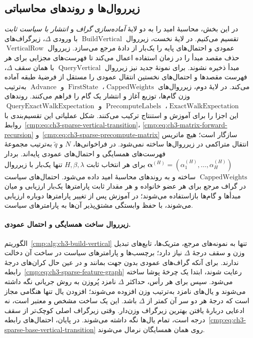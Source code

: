 \subsection{زیرروال‌ها و روندهای محاسباتی}
\label{cmp:subsec:ch3-computational-procedures}
در این بخش، محاسبهٔ امید را به دو لایهٔ
\emph{آماده‌سازی گراف} و \emph{انتشار با سیاست ثابت}
تقسیم می‌کنیم. در لایهٔ نخست،
زیرروال $\operatorname{BuildVertical}$ با ورودی
$\Delta$، زیرگراف‌های عمودی و احتمال‌های
پایه را یک‌بار از دادهٔ مرجع می‌سازد.
زیرروال $\operatorname{VerticalRow}$ حذف
مقصد مبدأ را در زمان استفاده اعمال
می‌کند تا فهرست‌های مجزایی برای هر
مبدأ ذخیره نشوند. برای نمونهٔ جدید نیز زیرروال
$\operatorname{QueryVertical}$ با همان سقف $\Delta$،
فهرست مقصدها و احتمال‌های نخستین انتقال عمودی را
مستقل از فرضیهٔ طبقه آماده می‌کند.
در لایهٔ دوم،
زیرروال‌های $\operatorname{CappedWeights}$،
$\operatorname{FirstState}$ و
$\operatorname{Advance}$ به‌ترتیب
وزن گام‌ها، توزیع آغاز و انتشار یک گام
را فراهم می‌کنند. روندهای
$\operatorname{ExactWalkExpectation}$،
$\operatorname{PrecomputeLabels}$ و
$\operatorname{QueryExactWalkExpectation}$ این اجزا
را برای آموزش و استنتاج ترکیب می‌کنند.
شکل عملیاتی این تقسیم‌بندی با
روابط~\eqref{cmp:eq:ch3-sparse-vertical-transition}،
\eqref{cmp:eq:ch3-matrix-forward-recursion}
و~\eqref{cmp:eq:ch3-sparse-precompute-matrix}
سازگار است؛ هیچ ماتریس انتقال
متراکمی در زیرروال‌ها ساخته نمی‌شود.
در فراخوانی‌ها، $N$ و $\widetilde q$ به‌ترتیب
مجموعهٔ فهرست‌های همسایگی و احتمال‌های عمودی پایه‌اند.
بردار $\boldsymbol\alpha^{(H)}=(\alpha_1^{(H)},\ldots,\alpha_H^{(H)})$
برای هر انتخاب ثابت $H,\beta,\lambda$ تنها یک‌بار
با زیرروال $\operatorname{CappedWeights}$ ساخته
و به روندهای محاسبهٔ امید داده می‌شود.
احتمال‌های سیاست در گراف مرجع برای هر عضو خانواده
و هر مقدار ثابت پارامترها یک‌بار ارزیابی و میان
مبدأها و گام‌ها بازاستفاده می‌شوند؛ در آموزش پس از
تغییر پارامترها دوباره ارزیابی می‌شوند، با حفظ
وابستگی مشتق‌پذیر آن‌ها به پارامترهای سیاست.

\paragraph{زیرروال ساخت همسایگی و احتمال عمودی.}
الگوریتم~\ref{cmp:alg:ch3-build-vertical}
تنها به نمونه‌های مرجع، متریک‌ها،
تابع‌های تبدیل وزن و سقف درجهٔ
$\Delta$ نیاز دارد؛ برچسب‌ها و
پارامترهای سیاست در ساخت آن
دخالت ندارند. برای آنکه گراف‌های
عمودی بدون جهت بمانند و در عین
حال کران‌های درجهٔ
رابطه~\eqref{cmp:eq:ch3-sparse-feature-graph}
رعایت شوند، ابتدا یک چرخهٔ پوشا
ساخته می‌شود. سپس برای هر رأس،
حداکثر $\Delta$ نامزد پُروزن به
روش جریانی نگه داشته می‌شوند
و یال‌های نامزد به‌ترتیب وزن
افزوده می‌شوند؛ افزودن یال
تنها هنگامی مجاز است که درجهٔ
هر دو سر آن کمتر از $\Delta$ باشد.
این یک ساخت مشخص و معتبر است،
نه ادعایی دربارهٔ یافتن بهترین
زیرگراف وزن‌دار. وقتی زیرگراف
اصلی کوچک‌تر از سقف درجه است،
تمام یال‌ها نگه داشته می‌شوند.
در پایان، احتمال‌های
رابطه~\eqref{cmp:eq:ch3-sparse-base-vertical-transition}
روی همان همسایگان نرمال می‌شوند.

